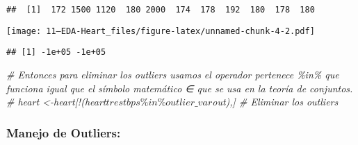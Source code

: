 \documentclass[
]{article}
\newenvironment{Shaded}{\begin{snugshade}}{\end{snugshade}}
\newcommand{\AttributeTok}[1]{\textcolor[rgb]{0.77,0.63,0.00}{#1}}
\newcommand{\CommentTok}[1]{\textcolor[rgb]{0.56,0.35,0.01}{\textit{#1}}}
\newcommand{\ConstantTok}[1]{\textcolor[rgb]{0.00,0.00,0.00}{#1}}
\newcommand{\FunctionTok}[1]{\textcolor[rgb]{0.00,0.00,0.00}{#1}}
\newcommand{\NormalTok}[1]{#1}
\newcommand{\OtherTok}[1]{\textcolor[rgb]{0.56,0.35,0.01}{#1}}
\newcommand{\SpecialCharTok}[1]{\textcolor[rgb]{0.00,0.00,0.00}{#1}}
\newcommand{\StringTok}[1]{\textcolor[rgb]{0.31,0.60,0.02}{#1}}
\begin{document}
\begin{verbatim}
##  [1]  172 1500 1120  180 2000  174  178  192  180  178  180
\end{verbatim}

\begin{Shaded}
\end{Shaded}

\texttt{[image: 11--EDA-Heart\_files/figure-latex/unnamed-chunk-4-2.pdf]}

\begin{Shaded}
\end{Shaded}

\begin{verbatim}
## [1] -1e+05 -1e+05
\end{verbatim}

\begin{Shaded}
\begin{Highlighting}[]
\CommentTok{\# Entonces para eliminar los outliers usamos el operador pertenece \%in\% que funciona igual que el símbolo matemático ∈ que se usa en la teoría de conjuntos.}
\CommentTok{\# heart \textless{}{-}heart[!(heart$trestbps \%in\% outlier\_var$out),]  \# Eliminar los outliers}
\end{Highlighting}
\end{Shaded}

\hypertarget{manejo-de-outliers}{%
\subsubsection{Manejo de Outliers:}\label{manejo-de-outliers}}
\end{document}
